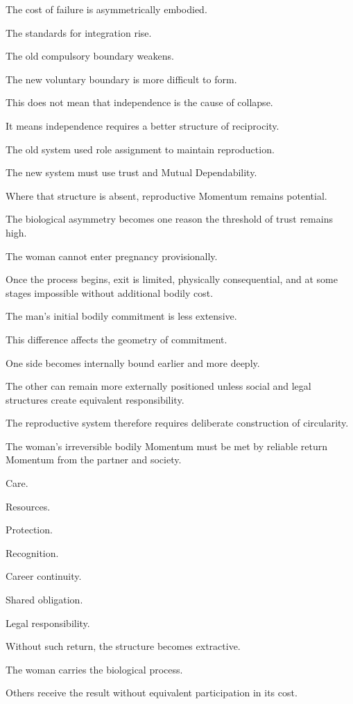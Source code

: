 The cost of failure is asymmetrically embodied.

The standards for integration rise.

The old compulsory boundary weakens.

The new voluntary boundary is more difficult to form.

This does not mean that independence is the cause of collapse.

It means independence requires a better structure of reciprocity.

The old system used role assignment to maintain reproduction.

The new system must use trust and Mutual Dependability.

Where that structure is absent, reproductive Momentum remains potential.

The biological asymmetry becomes one reason the threshold of trust remains high.

The woman cannot enter pregnancy provisionally.

Once the process begins, exit is limited, physically consequential, and at some stages impossible without additional bodily cost.

The man’s initial bodily commitment is less extensive.

This difference affects the geometry of commitment.

One side becomes internally bound earlier and more deeply.

The other can remain more externally positioned unless social and legal structures create equivalent responsibility.

The reproductive system therefore requires deliberate construction of circularity.

The woman’s irreversible bodily Momentum must be met by reliable return Momentum from the partner and society.

Care.

Resources.

Protection.

Recognition.

Career continuity.

Shared obligation.

Legal responsibility.

Without such return, the structure becomes extractive.

The woman carries the biological process.

Others receive the result without equivalent participation in its cost.

